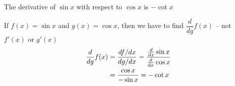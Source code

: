 \documentclass[14pt,fleqn]{extarticle}
\begin{document}
 
\begin{snippet}
    \correct
    
    The derivative of $\sin x$ with respect to $\cos x$ is $-\cot x$ 
    
    \reason
    
    If $f(x) = \sin x$ and $g(x) = \cos x$, then we have to find $\dfrac{d}{d g} f(x)$ -- not $f'(x)$ or $g'(x)$ 
    \begin{align}
	\frac{d}{dg} f(x) &= \dfrac{ df / dx}{dg / dx} = \dfrac{ \frac{d}{dx} \sin x}{\frac{d}{dx} \cos x} \\
	&= \dfrac{\cos x}{-\sin x} = -\cot x 
\end{align}
    
\end{snippet} 
\end{document}
